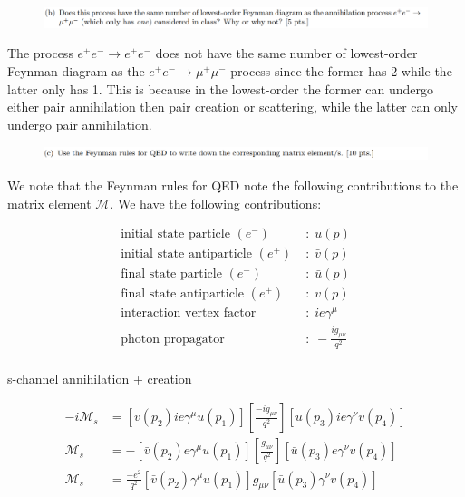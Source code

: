 \documentclass[11pt]{article}
\theoremstyle{definition}
\numberwithin{equation}{section}
\begin{document}
\newpage



\begin{figure}[H]
    \centering
    \includegraphics[scale = 0.4]{1b.png}
\end{figure}

The process $e^+e^- \to e^+e^-$ does not have the same number of lowest-order Feynman diagram as the $e^+e^- \to \mu^+\mu^-$ process since the former has 2 while the latter only has 1. This is because in the lowest-order the former can undergo either pair annihilation then pair creation or scattering, while the latter can only undergo pair annihilation.


\newpage
\begin{figure}[H]
    \centering
    \includegraphics[scale = 0.4]{1c.png}
\end{figure}


We note that the Feynman rules for QED note the following contributions to the matrix element $\mathcal{M}$. We have the following contributions:

\begin{align*}
    \text{initial state particle }(e^{-}) \; &: \; u(p)\\
    \text{initial state antiparticle }(e^{+}) \; &: \; \bar{v}(p)\\
    \text{final state particle }(e^{-}) \; &: \; \bar{u}(p)\\
    \text{final state antiparticle }(e^{+}) \; &: \; v(p)\\
    \text{interaction vertex factor } \; &: \; ie\gamma^{\mu}\\
    \text{photon propagator} \; &: \; -\frac{ig_{\mu\nu}}{q^2}\\
\end{align*}



\underline{s-channel annihilation + creation}

\begin{align}
    -i\mathcal{M}_{s} &= [\bar{v}(p_2)ie\gamma^{\mu}u(p_1)] 
    \left[ \frac{-ig_{\mu\nu}}{q^2} \right]
    [\bar{u}(p_3)ie\gamma^{\nu}v(p_4)]\\
    \mathcal{M}_{s} &= -[\bar{v}(p_2)e\gamma^{\mu}u(p_1)] 
    \left[ \frac{g_{\mu\nu}}{q^2} \right]
    [\bar{u}(p_3)e\gamma^{\nu}v(p_4)]\\
    \mathcal{M}_{s} &= \frac{-e^2}{q^2} [\bar{v}(p_2)\gamma^{\mu}u(p_1)]
    g_{\mu\nu}[\bar{u}(p_3)\gamma^{\nu}v(p_4)]\\
\end{align}
\end{document}
